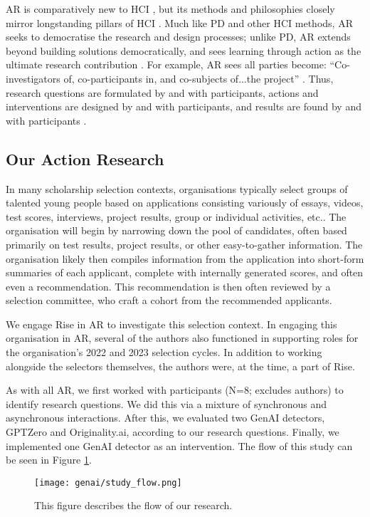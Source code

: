 AR is comparatively new to HCI \cite{Hayes_2011,lu_organizing_2023}, but its methods and philosophies closely mirror longstanding pillars of HCI \cite{Hayes_2011}. Much like PD and other HCI methods, AR seeks to democratise the research and design processes; unlike PD, AR extends beyond building solutions democratically, and sees learning through action as the ultimate research contribution \cite{Hayes_2011}. For example, AR sees all parties become: ``Co-investigators of, co-participants in, and co-subjects of...the project'' \cite{Hayes_2011}.  Thus, research questions are formulated by and with participants, actions and interventions are designed by and with participants, and results are found by and with participants \cite{Hayes_2011}.

\subsection{Our Action Research}
In many scholarship selection contexts, organisations typically select groups of talented young people based on applications consisting variously of essays, videos, test scores, interviews, project results, group or individual activities, etc.. The organisation will begin by narrowing down the pool of candidates, often based primarily on test results, project results, or other easy-to-gather information. The organisation likely then compiles information from the application into short-form summaries of each applicant, complete with internally generated scores, and often even a recommendation. This recommendation is then often reviewed by a selection committee, who craft a cohort from the recommended applicants.

We engage Rise in AR to investigate this selection context. In engaging this organisation in AR, several of the authors also functioned in supporting roles for the organisation's 2022 and 2023 selection cycles. In addition to working alongside the selectors themselves, the authors were, at the time, a part of Rise.

As with all AR, we first worked with participants (N=8; excludes authors) to identify research questions. We did this via a mixture of synchronous and asynchronous interactions. After this, we evaluated two GenAI detectors, GPTZero and Originality.ai, according to our research questions. Finally, we implemented one GenAI detector as an intervention. The flow of this study can be seen in Figure \ref{fig:flow}.

\begin{figure}[htbp]
  \centering
  \texttt{[image: genai/study\_flow.png]}
  \caption{This figure describes the flow of our research.}
  \label{fig:flow}
\end{figure}

